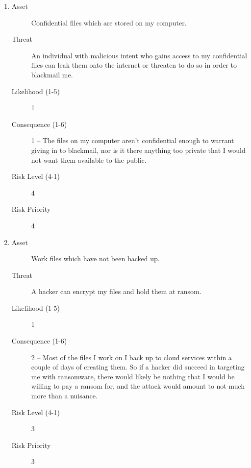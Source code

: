\documentclass{article}
\begin{document}
\begin{enumerate}
	\item
		\begin{description}
			\item[Asset] Confidential files which are stored on my computer.
			\item[Threat] An individual with malicious intent who gains access to my confidential files can leak them onto the internet or threaten to do so in order to blackmail me.
			\item[Likelihood (1-5)] 1
			\item[Consequence (1-6)] 1 -- The files on my computer aren't confidential enough to warrant giving in to blackmail, nor is it there anything too private that I would not want them available to the public.
			\item[Risk Level (4-1)] 4
			\item[Risk Priority] 4
		\end{description}

	\item
		\begin{description}
			\item[Asset] Work files which have not been backed up.
			\item[Threat] A hacker can encrypt my files and hold them at ransom.
			\item[Likelihood (1-5)] 1
			\item[Consequence (1-6)] 2 -- Most of the files I work on I back up to cloud services within a couple of days of creating them. So if a hacker did succeed in targeting me with ransomware, there would likely be nothing that I would be willing to pay a ransom for, and the attack would amount to not much more than a nuisance.
			\item[Risk Level (4-1)] 3
			\item[Risk Priority] 3
		\end{description}
\end{enumerate}
\end{document}
